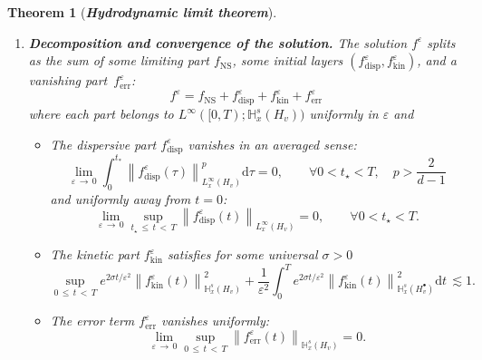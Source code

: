 \documentclass[10pt]{amsart}
\newtheorem{theo}{Theorem}[section]
\theoremstyle{definition}\newtheorem{defi}[theo]{Definition}\newtheorem{rema}[theo]{Remark}\newtheorem{exam}[theo]{Example}\newtheorem{exem}[theo]{Example}\newtheorem{nota}[theo]{Notation}
\newcommand{\err}{\mathrm{err}}
\newcommand{\ns}{\mathrm{NS}}
\newcommand{\kin}{\mathrm{kin}}
\renewcommand{\d}{\mathrm{d}}
\newcommand{\disp}{\mathrm{disp}}
\newcommand{\bbH}{\mathbb{H}}
\newcommand{\Ss}{H}
\newcommand{\Ssp}{H^{\bullet}}
\renewcommand*\le{\leqslant}
\renewcommand*\geq{\geqslant}
\newcommand*\eps{{\varepsilon}}
\let\oldforall\forall
\renewcommand*{\forall}{\mathrel{\oldforall}}
\begin{document}
\begin{theo}[\emph{\textbf{Hydrodynamic limit theorem}}]
\begin{enumerate}
\[
\sup_{0\,\le\,t\,<\,T} \left\| f^\eps(t) \right\|_{ \bbH^s_x \left(\Ss_v \right) } \le \frac{c_0}{\eps},
\]
which satisfies furthermore the following uniform estimate:
\[
\sup_{0\,\le\,t\,<\,T} \left\| f^\eps(t) \right\|_{ \bbH^s_x \left(\Ss_v \right) }^2 + \int_0^T \left\| | \nabla_x |^{ 1-\alpha} f^\eps(t) \right\|_{ \bbH^{s - (1-\alpha) }_x \left(\Ssp_v \right) }^2 \d t \, \lesssim 1,
\]
where we recall that $0 < \alpha < \frac{1}{2}$ if $d=2$ and $\alpha=0$ if $d\geq3.$
\item\label{theo1.12.2} \textit{\textbf{Decomposition and convergence of the solution.}} The solution $f^\eps$ splits as the sum of some limiting part $f_\ns$, some initial layers $(f^\eps_\disp, f^\eps_\kin)$, and a vanishing part~$f^\eps_\err$:
\begin{equation}\label{eq:decomp}
f^\eps = f_\ns + f^\eps_\disp + f^\eps_\kin + f^\eps_\err
\end{equation}
where {each part belongs to $L^\infty([0, T) ; \bbH_x^s (\Ss_v))$ uniformly in $\eps$ and}
\begin{itemize}
\item The dispersive part $f^\eps_\disp$ vanishes in an averaged sense:
\begin{equation*}
\lim_{\eps\,\to\,0}\int_0^{t_*} \left\|f^\eps_\disp(\tau)\right\|^p_{L^\infty_x(\Ss_v)}\d\tau=0, \qquad \forall 0 < t_\star < T, \quad p >\frac{2}{d-1}
\end{equation*}
and uniformly away from $t=0$:
\begin{equation*}
\lim_{\eps\,\to\,0}\sup_{t_\star\,\le\,t\,<\,T} \left\| f^\eps_\disp(t)\right\|_{ L^\infty_x \left(\Ss_v \right) }=0, \qquad \forall 0 < t_\star < T.
\end{equation*}
\item The kinetic part $f^\eps_\kin$ satisfies for some universal $\sigma > 0$
\begin{equation}\label{eq:fKIN}
\sup_{0\,\le\,t\,<\,T} e^{2 \sigma t / \eps^2} \left\| f^\eps_\kin(t) \right\|_{ \bbH^s_x \left(\Ss_v \right) }^2 + \frac{1}{\eps^2} \int_0^T e^{2 \sigma t / \eps^2} \left\| f^\eps_\kin(t) \right\|_{ \bbH^s_x \left(\Ssp_v \right) }^2 \d t \, {\lesssim 1}.
\end{equation}
\item The error term $f^\eps_\err$ vanishes uniformly:
\begin{equation*}
\lim_{\eps\,\to\,0} \sup_{0\,\le\,t\,<\,T} \left\| f^\eps_\err(t)\right\|_{ \bbH^s_x \left(\Ss_v \right) }=0.
\end{equation*}
\end{itemize}
\end{enumerate}
\end{theo}
\end{document}
